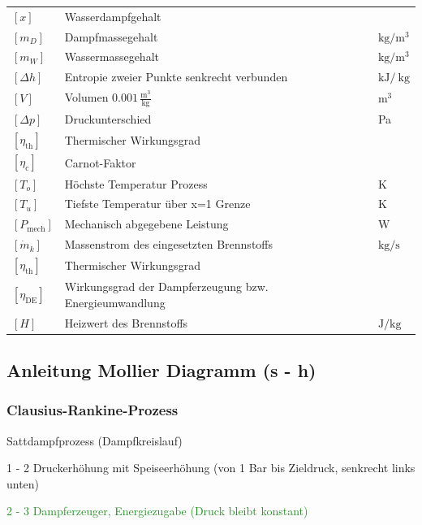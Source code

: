     \begin{tabular}{@{} l p{7.5cm} l @{}}
    $[x]$ & Wasserdampfgehalt \dotfill &    \\
    $[m_D]$ & Dampfmassegehalt \dotfill & $\mathrm{kg/m^3}$    \\
    $[m_W]$ & Wassermassegehalt \dotfill & $\mathrm{kg/m^3}$    \\
    $[\Delta h]$ & Entropie zweier Punkte senkrecht verbunden \dotfill & $\mathrm{kJ/\ kg}$   \\
    $[V]$ & Volumen $0.001\,\mathrm{\frac{m^3}{kg}}$\dotfill & $\mathrm{m^3}$ \\
    $[\Delta p]$ & Druckunterschied \dotfill & Pa \\
    $[\eta_{\mathrm{th}}]$ & Thermischer Wirkungsgrad \dotfill &  \\
    $[\eta_{\mathrm{c}}]$ & Carnot-Faktor \dotfill &  \\
    $[T_o]$ & Höchste Temperatur Prozess \dotfill & $\mathrm{K}$ \\
    $[T_u]$ & Tiefste Temperatur über x=1 Grenze \dotfill & $\mathrm{K}$ \\
    $[P_{\text{mech}}]$ & Mechanisch abgegebene Leistung \dotfill & $\mathrm{W}$ \\
    $[\dot{m}_k]$ & Massenstrom des eingesetzten Brennstoffs \dotfill & $\mathrm{kg/s}$ \\
    $[\eta_{\text{th}}]$ & Thermischer Wirkungsgrad \dotfill &  \\
    $[\eta_{\text{DE}}]$ & Wirkungsgrad der Dampferzeugung bzw. Energieumwandlung \dotfill &  \\
    $[H]$ & Heizwert des Brennstoffs \dotfill & $\mathrm{J/kg}$ \\
    \end{tabular}


\subsection{Anleitung Mollier Diagramm (s - h)}
\subsubsection{Clausius-Rankine-Prozess}
    Sattdampfprozess (Dampfkreislauf)

    1 - 2 Druckerhöhung mit Speiseerhöhung (von 1 Bar bis Zieldruck, senkrecht links unten)

    \textcolor{ForestGreen}{2 - 3 Dampferzeuger, Energiezugabe (Druck bleibt konstant)}

